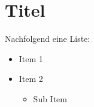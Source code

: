 \documentclass[16pt]{article}
\begin{document}
\section{Titel}
Nachfolgend eine Liste:
\begin{itemize}
  \item Item 1
  \item Item 2
   \begin{itemize}
      \item Sub Item
   \end{itemize}
\end{itemize}
\end{document}
